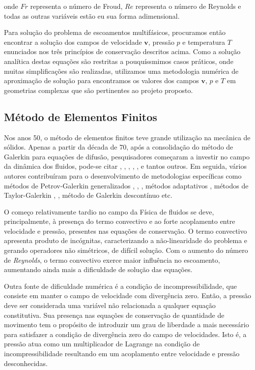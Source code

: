 \documentclass[a4paper,portuges]{article}
\newcommand{\vvet}{\mathbf{v}}
\begin{document}
\noindent onde $Fr$ representa o número de Froud, $Re$ representa o
número de Reynolds e todas as outras variáveis estão eu sua forma
adimensional.

Para solução do problema de escoamentos multifásicos, procuramos então
encontrar a solução dos campos de velocidade $\vvet$, pressão $p$ e
temperatura $T$ enunciados nos três princípios de conservação descritos
acima. Como a solução analítica destas equações são restritas a
pouquíssmimos casos práticos, onde muitas simplificações são realizadas,
utilizamos uma metodologia numérica de aproximação de solução para
encontramos os valores dos campos $\vvet$, $p$ e $T$ em geometrias
complexas que são pertinentes ao projeto proposto. 

\subsection{Método de Elementos Finitos}
Nos anos 50, o método de elementos finitos teve grande utilização na
mecânica de sólidos.  Apenas a partir da década de 70, após a
consolidação do método de Galerkin para equações de difusão,
pesquisadores começaram a investir no campo da dinâmica dos fluidos,
pode-se citar \cite{zienkiewicz1965}, \cite{oden1972}, \cite{oden1998},
\cite{chung1978}, \cite{hughes1982}, \cite{pironneau1989} e tantos
outros.  Em seguida, vários autores contribuíram para o desenvolvimento
de metodologias específicas como métodos de Petrov-Galerkin
generalizados \cite{heinrich1977}, \cite{hughes1986},
\cite{johnson1987}, métodos adaptativos \cite{oden1989}, métodos de
Taylor-Galerkin \cite{donea1984}, \cite{lohner1985}, método de Galerkin
descontínuo \cite{oden1998} etc.

O começo relativamente tardio no campo da Física de fluidos se deve,
principalmente, à presença do termo convectivo e ao forte acoplamento
entre velocidade e pressão, presentes nas equações de conservação. O
termo convectivo apresenta produto de incógnitas, caracterizando a
não-linearidade do problema e gerando operadores não simétricos, de
difícil solução.  Com o aumento do número de \emph{Reynolds}, o termo
convectivo exerce maior influência no escoamento, aumentando ainda mais
a dificuldade de solução das equações.

Outra fonte de dificuldade numérica é a condição de incompressibilidade,
que consiste em manter o campo de velocidade com divergência zero.
Então, a pressão deve ser considerada uma variável não relacionada a
qualquer equação constitutiva.  Sua presença nas equações de conservação
de quantidade de movimento tem o propósito de introduzir um grau de
liberdade a mais necessário para satisfazer a condição de divergência
zero do campo de velocidades.  Isto é, a pressão atua como um
multiplicador de Lagrange na condição de incompressibilidade resultando
em um acoplamento entre velocidade e pressão desconhecidas.
\end{document}
